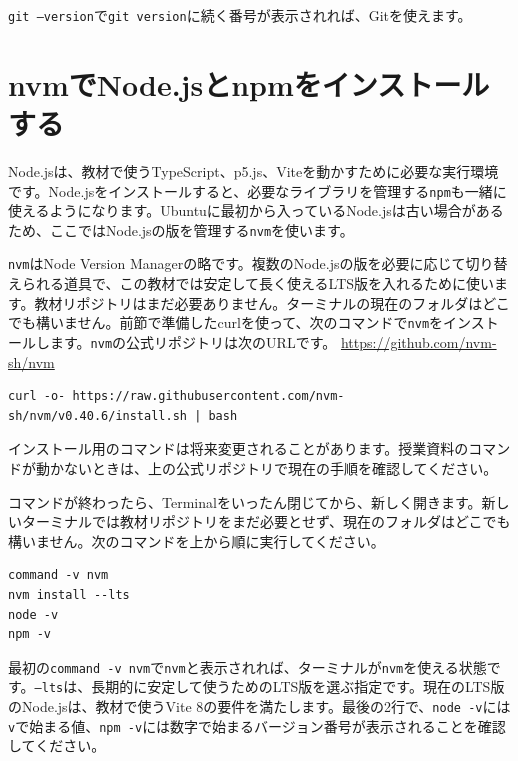 \texttt{git --version}で\texttt{git version}に続く番号が表示されれば、Gitを使えます。

\section{nvmでNode.jsとnpmをインストールする}

Node.jsは、教材で使うTypeScript、p5.js、Viteを動かすために必要な実行環境です。Node.jsをインストールすると、必要なライブラリを管理する\texttt{npm}も一緒に使えるようになります。Ubuntuに最初から入っているNode.jsは古い場合があるため、ここではNode.jsの版を管理する\texttt{nvm}を使います。

\texttt{nvm}はNode Version Managerの略です。複数のNode.jsの版を必要に応じて切り替えられる道具で、この教材では安定して長く使えるLTS版を入れるために使います。教材リポジトリはまだ必要ありません。ターミナルの現在のフォルダはどこでも構いません。前節で準備したcurlを使って、次のコマンドで\texttt{nvm}をインストールします。\texttt{nvm}の公式リポジトリは次のURLです。
\url{https://github.com/nvm-sh/nvm}

\begin{listing}[htbp]
\begin{verbatim}
curl -o- https://raw.githubusercontent.com/nvm-sh/nvm/v0.40.6/install.sh | bash
\end{verbatim}
\caption{nvmをインストールするコマンド}
\label{lst:appendix-ubuntu-install-nvm}
\end{listing}

インストール用のコマンドは将来変更されることがあります。授業資料のコマンドが動かないときは、上の公式リポジトリで現在の手順を確認してください。

コマンドが終わったら、Terminalをいったん閉じてから、新しく開きます。新しいターミナルでは教材リポジトリをまだ必要とせず、現在のフォルダはどこでも構いません。次のコマンドを上から順に実行してください。

\begin{listing}[htbp]
\begin{verbatim}
command -v nvm
nvm install --lts
node -v
npm -v
\end{verbatim}
\caption{nvm、Node.js、npmを確認してLTS版をインストールするコマンド}
\label{lst:appendix-ubuntu-install-node}
\end{listing}

最初の\texttt{command -v nvm}で\texttt{nvm}と表示されれば、ターミナルが\texttt{nvm}を使える状態です。\texttt{--lts}は、長期的に安定して使うためのLTS版を選ぶ指定です。現在のLTS版のNode.jsは、教材で使うVite 8の要件を満たします。最後の2行で、\texttt{node -v}には\texttt{v}で始まる値、\texttt{npm -v}には数字で始まるバージョン番号が表示されることを確認してください。

